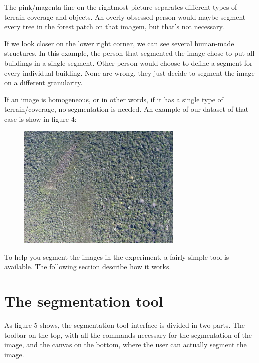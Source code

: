 The pink/magenta line on the rightmost picture separates different types of terrain coverage and objects. An overly obsessed person would maybe segment every tree in the forest patch on that imagem, but that's not necessary.

If we look closer on the lower right corner, we can see several human-made structures. In this example, the person that segmented the image chose to put all buildings in a single segment. Other person would choose to define a segment for every individual building. None are wrong, they just decide to segment the image on a different granularity.

If an image is homogeneous, or in other words, if it has a single type of terrain/coverage, no segmentation is needed. An example of our dataset of that case is show in figure 4:


\begin{figure}[h!]
  \centering
  \includegraphics[width=0.7\textwidth]{imgs/manualseginstr_fig4}
\end{figure}

To help you segment the images in the experiment, a fairly simple tool is available. The following section describe how it works.

\section*{The segmentation tool}

As figure 5 shows, the segmentation tool interface is divided in two parts. The toolbar on the top, with all the commands necessary for the segmentation of the image, and the canvas on the bottom, where the user can actually segment the image.

